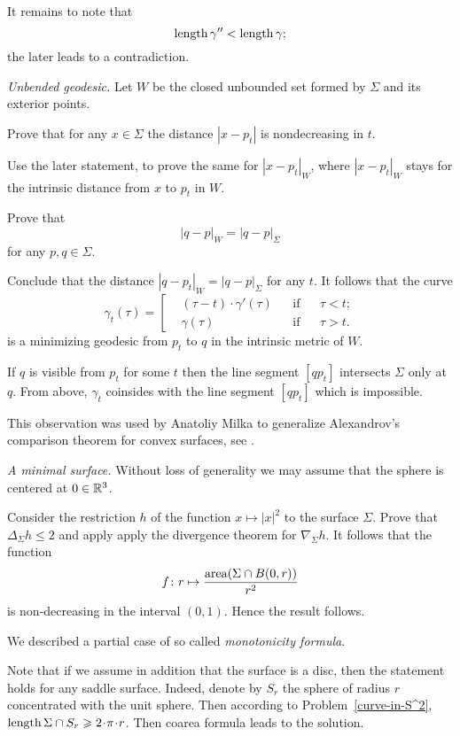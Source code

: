 It remains to note that 
\[\operatorname{\rm length}\gamma''<\operatorname{\rm length}\gamma;\]
the later leads to a contradiction.

 



\textit{Unbended geodesic.}
Let $W$ be the closed unbounded set formed by $\Sigma$ and its exterior points.

Prove that for any $x\in\Sigma$ the distance $|x - p_t|$ is nondecreasing in $t$.

Use the later statement, to prove the same for $|x - p_t|_W$,
where $|x - p_t|_W$ stays for the intrinsic distance from $x$ to $p_t$ in $W$.

Prove that 
\[|q - p|_W=|q - p|_\Sigma\] 
for any $p,q\in\Sigma$.


Conclude that the distance $|q - p_t|_W=|q - p|_\Sigma$
for any $t$.
It follows that the curve 
$$\gamma_t(\tau)=\left[
\begin{aligned}
&(\tau-t)\cdot\gamma'(\tau)&&\text{if}&&\tau< t;
\\
&\gamma(\tau)&&\text{if}&&\tau> t.
\end{aligned}
\right.$$
is a minimizing geodesic from $p_t$ to $q$ in the intrinsic metric of $W$. 

If $q$ is visible from $p_t$ for some $t$ then the line segment $[qp_t]$ intersects $\Sigma$ only at $q$.
From above, 
$\gamma_t$  coinsides with the line segment $[qp_t]$ which is impossible.

This  observation was used by Anatoliy Milka
to generalize Alexandrov's comparison theorem for convex surfaces, see \cite{milka-geod}.

\textit{A minimal surface.}
Without loss of generality we may assume that the sphere is centered at $0\in\mathbb{R}^3$.

Consider the restriction $h$ of the function $x\mapsto |x|^2$ to the surface $\Sigma$.
Prove that $\Delta_\Sigma h\le 2$ and apply apply the divergence theorem for $\nabla_\Sigma h$.
It follows that the function
\[f\colon r\mapsto \frac{\operatorname{\rm area}(\Sigma\cap B(0,r))}{r^2}
\]
is non-decreasing in the interval $(0,1)$.
Hence the result follows.

We described a partial case of so called \emph{monotonicity formula}.

Note that if we assume in addition that the surface is a disc,
then the statement holds for any saddle surface. 
Indeed, denote by $S_r$ the sphere of radius $r$ concentrated with the unit sphere. 
Then according to Problem~\ref{curve-in-S^2}, 
$\length \Sigma\cap S_r\ge 2\cdot\pi\cdot r$.
Then coarea formula leads to the solution.

